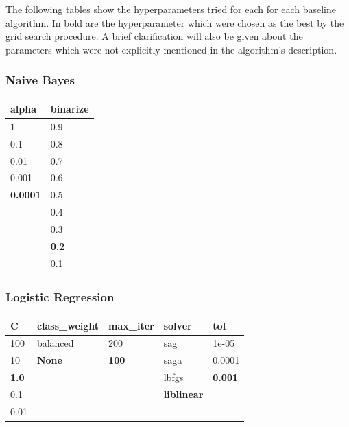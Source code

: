 \documentclass[epsfig,a4paper,11pt,titlepage,twoside,openany]{book}
\begin{document}
The following tables show the hyperparameters tried for each for each baseline algorithm. In bold are the hyperparameter which were chosen as the best by the grid search procedure. A brief clarification will also be given about the parameters which were not explicitly mentioned in the algorithm's description. 


\subsubsection{Naive Bayes}

\begin{table}[H]
\centering
\begin{tabular}{l|l}
alpha           & binarize     \\ \hline
1               & 0.9          \\
0.1             & 0.8          \\
0.01            & 0.7          \\
0.001           & 0.6          \\
\textbf{0.0001} & 0.5          \\
                & 0.4          \\
                & 0.3          \\
                & \textbf{0.2} \\
                & 0.1     
\end{tabular}
\end{table}


\subsubsection{Logistic Regression}

\begin{table}[H]
\centering
\begin{tabular}{l|l|l|l|l}
C            & class\_weight & max\_iter    & solver             & tol            \\ \hline
100          & balanced      & 200          & sag                & 1e-05          \\
10           & \textbf{None} & \textbf{100} & saga               & 0.0001         \\
\textbf{1.0} &               &              & lbfgs              & \textbf{0.001} \\
0.1          &               &              & \textbf{liblinear} &                \\
0.01         &               &              &                    & 
\end{tabular}
\end{table}
\end{document}
